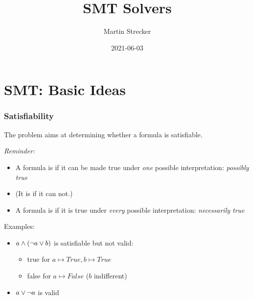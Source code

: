 \documentclass{beamer}
\title{SMT Solvers}
\author{Martin Strecker}
\date{2021-06-03}
\begin{document}

\begin{frame}
  \titlepage
\end{frame}



\section{SMT: Basic Ideas}

\begin{frame}[fragile]\frametitle{Satisfiability}


The  problem aims at determining whether a formula is
satisfiable.

\emph{Reminder:}
\begin{itemize}
\item A formula is  if it can be made true under \emph{one}
  possible interpretation: \emph{possibly true}
\item (It is   if it can not.)
\item A formula is  if it is true under \emph{every}
  possible interpretation: \emph{necessarily true}
\end{itemize}

\vspace{3mm}
Examples:
\begin{itemize}
\item $a \wedge (\neg a \vee b)$ is satisfiable but not valid:
  \begin{itemize}
  \item true for $a \mapsto True, b \mapsto True$
  \item false for $a \mapsto False$ ($b$ indifferent)
  \end{itemize}
\item $a \vee \neg a$ is valid  
\end{itemize}

\end{frame}
\end{document}
